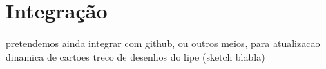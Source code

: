 \section{Integração}
pretendemos ainda integrar com github, ou outros meios, para atualizacao dinamica de cartoes
treco de desenhos do lipe (sketch blabla)


